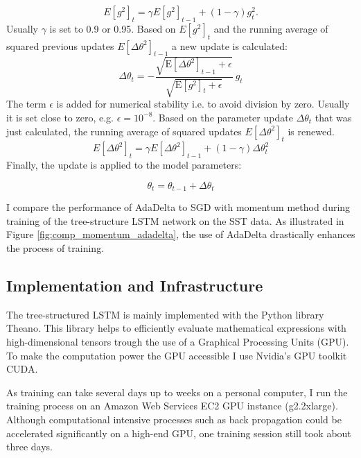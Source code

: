 \documentclass[a4paper,12pt]{article}%
\begin{document}
$$
E[g^2]_t = \gamma E[g^2]_{t-1} + (1 - \gamma) g^2_t.
$$
Usually $\gamma$ is set to 0.9 or 0.95. Based on $E[g^2]_t$ and the running average of squared previous updates $E[\Delta \theta^2]_{t-1}$ a new update is calculated:
$$
\Delta \theta_t = -\frac{\sqrt{\mathrm{E}[\Delta \theta^2]_{t-1} + \epsilon}}{\sqrt{\mathrm{E}[g^2]_{t} + \epsilon}} ~ g_t
$$
The term $\epsilon$ is added for numerical stability i.e. to avoid division by zero. Usually it is set close to zero, e.g. $\epsilon = 10^{-8}$. Based on the parameter update $\Delta \theta_t $ that was just calculated, the running average of squared updates $E[\Delta \theta^2]_t$ is renewed.
$$
E[\Delta \theta^2]_t = \gamma E[\Delta \theta^2]_{t-1} + (1 - \gamma) \Delta \theta^2_t
$$ 
Finally, the update is applied to the model parameters:

$$
\theta_t = \theta_{t-1} + \Delta \theta_t 
$$

I compare the performance of AdaDelta to SGD with momentum method during training of the tree-structure LSTM network on the SST data. As illustrated in Figure \ref{fig:comp_momentum_adadelta}, the use of AdaDelta drastically enhances the process of training.


\subsection{Implementation and Infrastructure}
The tree-structured LSTM is mainly implemented with the Python library Theano. This library helps to efficiently evaluate mathematical expressions with high-dimensional tensors trough the use of a Graphical Processing Units (GPU). To make the computation power the GPU accessible I use Nvidia's GPU toolkit CUDA.

As training can take several days up to weeks on a personal computer, I run the training process on an Amazon Web Services EC2 GPU instance (g2.2xlarge). Although computational intensive processes such as back propagation could be accelerated significantly on a high-end GPU, one training session still took about three days.
\end{document}
